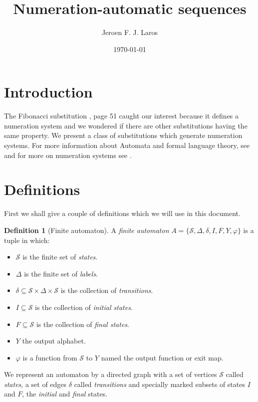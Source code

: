 \documentclass{article}
\title{\Huge{Numeration-automatic sequences}}
\author{Jeroen F. J. Laros}
\date{\today}
\theoremstyle{definition}
\newtheorem{definition}[theorem]{Definition}
\begin{document}
\maketitle
\newpage

\tableofcontents
\newpage

\section{Introduction}
The Fibonacci substitution \cite{Fogg}, page 51 caught our interest because it 
defines a numeration system and we wondered if there are other substitutions 
having the same property. We present a class of substitutions which generate 
numeration systems. For more information about Automata and formal language
theory, see \cite{Wood} and for more on numeration systems see \cite{Loth}.

\section{Definitions}
First we shall give a couple of definitions which we will use in this document.

\begin{definition}[Finite automaton] \label{def:automaton}
A \emph{finite automaton} 
$A = \{\mathcal{S}, \Delta, \delta, I, F, Y, \varphi\}$ is a tuple in which:
\begin{itemize}
\item $\mathcal{S}$ is the finite set of \emph{states}.
\item $\Delta$ is the finite set of \emph{labels}.
\item $\delta \subseteq \mathcal{S} \times \Delta \times \mathcal{S}$ is the
      collection of \emph{transitions}.
\item $I \subseteq \mathcal{S}$ is the collection of \emph{initial states}.
\item $F \subseteq \mathcal{S}$ is the collection of \emph{final states}.
\item $Y$ the output alphabet.
\item $\varphi$ is a function from $\mathcal{S}$ to $Y$ named the output
      function or exit map.
\end{itemize}
\end{definition}

We represent an automaton by a directed graph with a set of vertices
$\mathcal{S}$ called \emph{states}, a set of edges $\delta$ called
\emph{transitions} and specially marked subsets of states $I$ and $F$, the
\emph{initial} and \emph{final} states.
\end{document}
